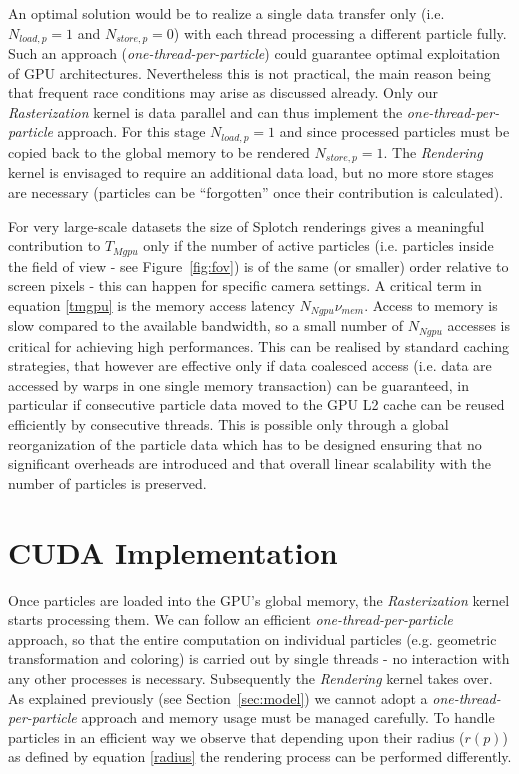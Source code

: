 \documentclass[1p]{elsarticle}
\begin{document}
An optimal solution would be to realize a single data transfer only
(i.e. $N_{load,p} = 1$ and $N_{store,p} = 0$) with each thread processing a different particle fully. Such an approach ({\it one-thread-per-particle}) could guarantee optimal exploitation of GPU architectures. Nevertheless this is not practical, the main reason being that frequent race conditions may arise as discussed already.
Only our {\it Rasterization} kernel is data parallel and can thus implement the {\it one-thread-per-particle} approach. For this stage $N_{load,p} = 1$ and since processed particles must be copied back to the global memory to be rendered $N_{store,p} = 1$. The {\it Rendering} kernel is envisaged to require an additional data load, but no more store 
stages are necessary (particles can be ``forgotten'' once their contribution is calculated).

For very large-scale datasets the size of Splotch renderings gives a meaningful contribution to $T_{Mgpu}$ only if the number of active particles (i.e. particles inside the field of view - see Figure~\ref{fig:fov}) is of the same (or smaller) order relative to screen pixels - this can happen for specific camera settings. A critical term in equation \eqref{tmgpu} is the memory access
latency $N_{Ngpu} \nu_{mem}$. Access to memory is slow compared to
the available bandwidth, so a small number of $N_{Ngpu}$ accesses is critical for achieving high performances. This can be realised by standard caching strategies, that
however are effective only if data coalesced access (i.e. data are accessed by warps in one single memory transaction) can be guaranteed, in particular if consecutive particle data moved to the GPU L2 cache can be reused efficiently by consecutive threads. This is possible only through a global reorganization of the particle data which has to be designed ensuring that no significant overheads are introduced and that overall linear scalability with the number of particles is preserved.

\section{CUDA Implementation}
\label{sec:implementation}

Once particles are loaded into the GPU's global memory, the {\it Rasterization} kernel starts processing them. We can follow an efficient {\it one-thread-per-particle} approach, so that the entire computation on individual particles (e.g. geometric transformation and coloring) is carried out by single threads - no interaction with any other processes is necessary. 
Subsequently the {\it Rendering} kernel takes over. As explained previously (see Section~\ref{sec:model}) we cannot adopt a {\it one-thread-per-particle} approach and memory usage must be managed carefully. To handle particles in an efficient way we observe that depending upon their radius ($r(p)$) as defined by equation \eqref{radius} the rendering process can be performed differently.
\end{document}
